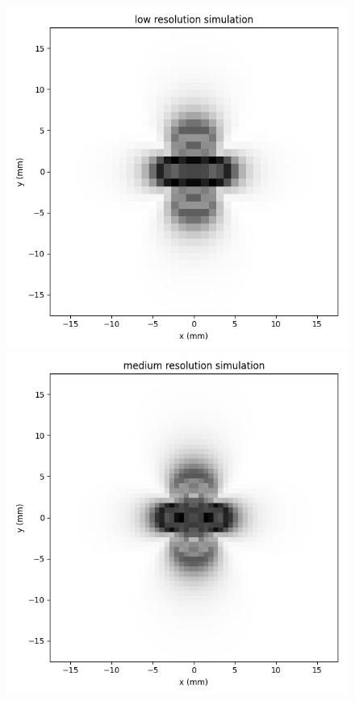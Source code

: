 \documentclass{article}
\begin{document}
\begin{figure}[h]
    \centering
    \begin{minipage}{0.3\textwidth}
        \centering
        \includegraphics[width=\textwidth]{img/low-resolution-simulation.png}
    \end{minipage}\hfill
    \begin{minipage}{0.3\textwidth}
        \centering
        \includegraphics[width=\textwidth]{img/medium-resolution-simulation.png}

\end{minipage}
\end{figure}
\end{document}
